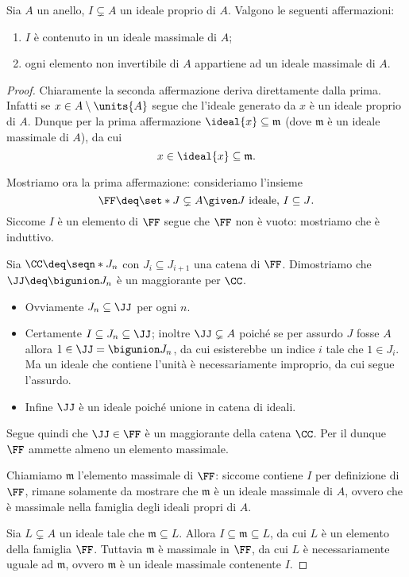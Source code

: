 \begin{proposition}{}{}
    Sia $A$ un anello, $I \subsetneq A$ un ideale proprio di $A$. Valgono le seguenti affermazioni:
    \begin{enumerate}[label={(\arabic*)}]
        \item $I$ è contenuto in un ideale massimale di $A$;
        \item ogni elemento non invertibile di $A$ appartiene ad un ideale massimale di $A$.
    \end{enumerate} 
\end{proposition}
\begin{proof}
    Chiaramente la seconda affermazione deriva direttamente dalla prima. Infatti se $x \in A \setminus \units{A}$ segue che l'ideale generato da $x$ è un ideale proprio di $A$. Dunque per la prima affermazione $\ideal{x} \subseteq \mathfrak{m}$ (dove $\mathfrak{m}$ è un ideale massimale di $A$), da cui \[
        x \in \ideal{x} \subseteq \mathfrak{m}.    
    \]

    Mostriamo ora la prima affermazione: consideriamo l'insieme \[
        \FF \deq \set*{J \subsetneq A \given J \text{ ideale, } I \subseteq J}.    
    \] Siccome $I$ è un elemento di $\FF$ segue che $\FF$ non è vuoto: mostriamo che è induttivo.

    Sia $\CC \deq \seqn*{J_n}$ con $J_i \subseteq J_{i+1}$ una catena di $\FF$. Dimostriamo che $\JJ \deq \bigunion J_n$ è un maggiorante per $\CC$.
    \begin{itemize}
        \item Ovviamente $J_n \subseteq \JJ$ per ogni $n$.
        \item Certamente $I \subseteq J_n \subseteq \JJ$; inoltre $\JJ \subsetneq A$ poiché se per assurdo $J$ fosse $A$ allora $1 \in \JJ = \bigunion J_n$, da cui esisterebbe un indice $i$ tale che $1 \in J_i$. Ma un ideale che contiene l'unità è necessariamente improprio, da cui segue l'assurdo.
        \item Infine $\JJ$ è un ideale poiché unione in catena di ideali.
    \end{itemize}
    Segue quindi che $\JJ \in \FF$ è un maggiorante della catena $\CC$. Per il  dunque $\FF$ ammette almeno un elemento massimale.

    Chiamiamo $\mathfrak{m}$ l'elemento massimale di $\FF$: siccome contiene $I$ per definizione di $\FF$, rimane solamente da mostrare che $\mathfrak{m}$ è un ideale massimale di $A$, ovvero che è massimale nella famiglia degli ideali propri di $A$.

    Sia $L \subsetneq A$ un ideale tale che $\mathfrak{m} \subseteq L$. Allora $I \subseteq \mathfrak{m} \subseteq L$, da cui $L$ è un elemento della famiglia $\FF$. Tuttavia $\mathfrak{m}$ è massimale in $\FF$, da cui $L$ è necessariamente uguale ad $\mathfrak{m}$, ovvero $\mathfrak{m}$ è un ideale massimale contenente $I$.
\end{proof}

